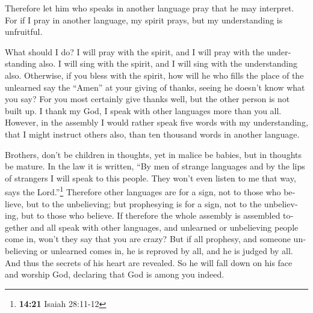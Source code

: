 \begin{paracol}{2}
\begin{otherlanguage}{english}
 Therefore let him who speaks in another language pray
that he may interpret.  For if I pray in another
language, my spirit prays, but my understanding is unfruitful.

 What should I do? I will pray with the spirit, and I
will pray with the understanding also. I will sing with the spirit, and
I will sing with the understanding also.  Otherwise, if
you bless with the spirit, how will he who fills the place of the
unlearned say the ``Amen'' at your giving of thanks, seeing he doesn't
know what you say?  For you most certainly give thanks
well, but the other person is not built up.  I thank my
God, I speak with other languages more than you all. 
However, in the assembly I would rather speak five words with my
understanding, that I might instruct others also, than ten thousand
words in another language.

 Brothers, don't be children in thoughts, yet in malice
be babies, but in thoughts be mature.  In the law it is
written, ``By men of strange languages and by the lips of strangers I
will speak to this people. They won't even listen to me that way, says
the Lord.''\footnote{\textbf{14:21} Isaiah 28:11-12} 
Therefore other languages are for a sign, not to those who believe, but
to the unbelieving; but prophesying is for a sign, not to the
unbelieving, but to those who believe.  If therefore the
whole assembly is assembled together and all speak with other languages,
and unlearned or unbelieving people come in, won't they say that you are
crazy?  But if all prophesy, and someone unbelieving or
unlearned comes in, he is reproved by all, and he is judged by all.
 And thus the secrets of his heart are revealed. So he
will fall down on his face and worship God, declaring that God is among
you indeed.


\end{otherlanguage}
\end{paracol}
